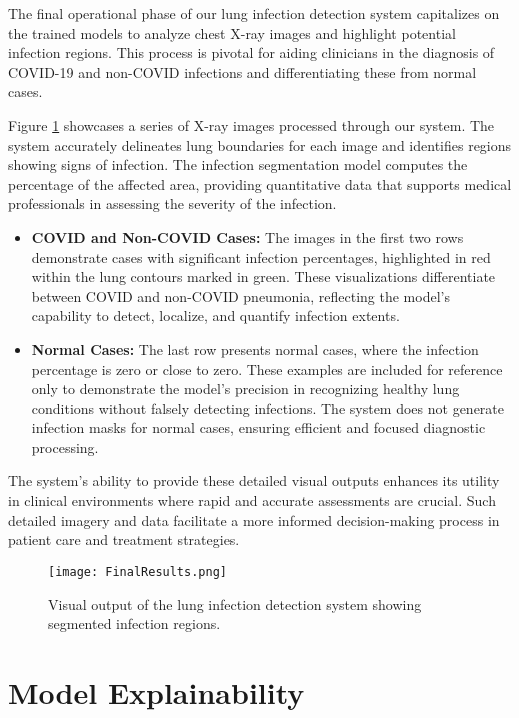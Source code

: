 \documentclass[10pt]{article}
\begin{document}
The final operational phase of our lung infection detection system capitalizes on the trained models to analyze chest X-ray images and highlight potential infection regions. This process is pivotal for aiding clinicians in the diagnosis of COVID-19 and non-COVID infections and differentiating these from normal cases.

Figure \ref{fig:FinalResults} showcases a series of X-ray images processed through our system. The system accurately delineates lung boundaries for each image and identifies regions showing signs of infection. The infection segmentation model computes the percentage of the affected area, providing quantitative data that supports medical professionals in assessing the severity of the infection.

\begin{itemize}
    \item \textbf{COVID and Non-COVID Cases:} The images in the first two rows demonstrate cases with significant infection percentages, highlighted in red within the lung contours marked in green. These visualizations differentiate between COVID and non-COVID pneumonia, reflecting the model's capability to detect, localize, and quantify infection extents.
	\item \textbf{Normal Cases:} The last row presents normal cases, where the infection percentage is zero or close to zero. These examples are included for reference only to demonstrate the model's precision in recognizing healthy lung conditions without falsely detecting infections. The system does not generate infection masks for normal cases, ensuring efficient and focused diagnostic processing.
\end{itemize}

The system's ability to provide these detailed visual outputs enhances its utility in clinical environments where rapid and accurate assessments are crucial. Such detailed imagery and data facilitate a more informed decision-making process in patient care and treatment strategies.

\begin{figure}[ht]
    \centering
    \texttt{[image: FinalResults.png]}
    \caption{Visual output of the lung infection detection system showing segmented infection regions.}
    \label{fig:FinalResults}
\end{figure}



\section{Model Explainability}
\end{document}
